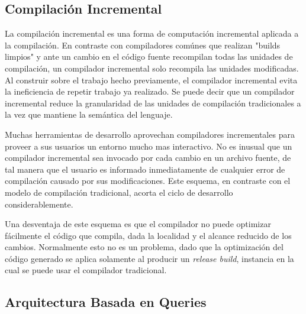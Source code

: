 \documentclass[12pt, a4paper]{report}
\begin{document}
\subsection*{Compilación Incremental}

La compilación incremental es una forma de computación incremental aplicada a la
compilación.
En contraste con compiladores comúnes que realizan "builds limpios" y ante un
cambio en el código fuente recompilan todas las unidades de compilación, un
compilador incremental solo recompila las unidades modificadas.
Al construir sobre el trabajo hecho previamente, el compilador incremental evita
la ineficiencia de repetir trabajo ya realizado.
Se puede decir que un compilador incremental reduce la granularidad de las
unidades de compilación tradicionales a la vez que mantiene la semántica del
lenguaje.
\cite{wiki_incremental_compiler}

Muchas herramientas de desarrollo aprovechan compiladores incrementales para
proveer a sus usuarios un entorno mucho mas interactivo.
No es inusual que un compilador incremental sea invocado por cada cambio en un
archivo fuente, de tal manera que el usuario es informado inmediatamente de
cualquier error de compilación causado por sus modificaciones.
Este esquema, en contraste con el modelo de compilación tradicional, acorta el
ciclo de desarrollo considerablemente.
\cite{wiki_incremental_compiler}

Una desventaja de este esquema es que el compilador no puede optimizar
fácilmente el código que compila, dada la localidad y el alcance reducido de los
cambios.
Normalmente esto no es un problema, dado que la optimización del código generado
se aplica solamente al producir un \textit{release build}, instancia en la cual
se puede usar el compilador tradicional.
\cite{wiki_incremental_compiler}

\subsection*{Arquitectura Basada en Queries \cite{olle_query_based}}
\end{document}
